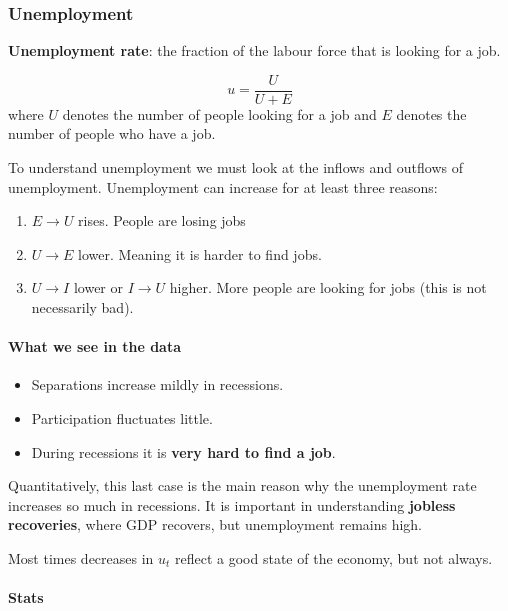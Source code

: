 \documentclass[11pt]{article}
\begin{document}
\subsubsection{Unemployment}

\begin{definition}
    \textbf{Unemployment rate}: the fraction of the labour force that is looking for a job.

    \[u = \dfrac{U}{U+E}\]
    where $U$ denotes the number of people looking for a job and $E$ denotes the number of people who have a job.
\end{definition}

To understand unemployment we must look at the inflows and outflows of unemployment. Unemployment can increase for at least three reasons:
\begin{enumerate}
    \item $E\rightarrow U$ rises. People are losing jobs
    \item $U\rightarrow E$ lower. Meaning it is harder to find jobs.
    \item $U\rightarrow I$ lower or $I \rightarrow U$ higher. More people are looking for jobs (this is not necessarily bad).
\end{enumerate}

\paragraph{What we see in the data} \mbox{}

\begin{itemize}
    \item Separations increase mildly in recessions.
    \item Participation fluctuates little.
    \item During recessions it is \textbf{very hard to find a job}.
\end{itemize}

Quantitatively, this last case is the main reason why the unemployment rate increases so much in recessions. It is important in understanding \textbf{jobless recoveries}, where GDP recovers, but unemployment remains high.

Most times decreases in $u_t$ reflect a good state of the economy, but not always.

\paragraph{Stats} \mbox{}
\end{document}
